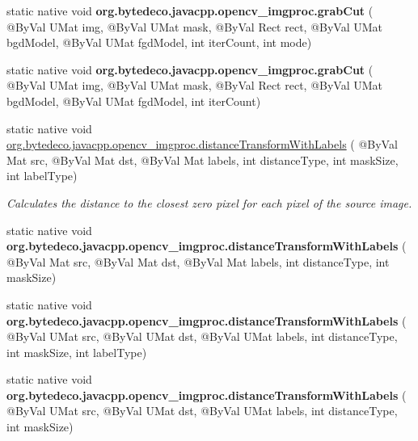 \begin{DoxyCompactItemize}
\item 
\mbox{\label{group__imgproc__misc_gab041eb7310c1d4f0d3ce2e7f2250c489}} 
static native void {\bfseries org.\+bytedeco.\+javacpp.\+opencv\+\_\+imgproc.\+grab\+Cut} ( @By\+Val U\+Mat img, @By\+Val U\+Mat mask, @By\+Val Rect rect, @By\+Val U\+Mat bgd\+Model, @By\+Val U\+Mat fgd\+Model, int iter\+Count, int mode)
\item 
\mbox{\label{group__imgproc__misc_gaab75a44bc618967aac53a0cb9edc9afd}} 
static native void {\bfseries org.\+bytedeco.\+javacpp.\+opencv\+\_\+imgproc.\+grab\+Cut} ( @By\+Val U\+Mat img, @By\+Val U\+Mat mask, @By\+Val Rect rect, @By\+Val U\+Mat bgd\+Model, @By\+Val U\+Mat fgd\+Model, int iter\+Count)
\item 
static native void \hyperlink{group__imgproc__misc_gaaaf8e9c28cfa3aa0fba026897d9ad6d8}{org.\+bytedeco.\+javacpp.\+opencv\+\_\+imgproc.\+distance\+Transform\+With\+Labels} ( @By\+Val Mat src, @By\+Val Mat dst, @By\+Val Mat labels, int distance\+Type, int mask\+Size, int label\+Type)
\begin{DoxyCompactList}\small\item\em Calculates the distance to the closest zero pixel for each pixel of the source image. \end{DoxyCompactList}\item 
\mbox{\label{group__imgproc__misc_gab10abe49dd9e7c89f5ce0119e86d2e5d}} 
static native void {\bfseries org.\+bytedeco.\+javacpp.\+opencv\+\_\+imgproc.\+distance\+Transform\+With\+Labels} ( @By\+Val Mat src, @By\+Val Mat dst, @By\+Val Mat labels, int distance\+Type, int mask\+Size)
\item 
\mbox{\label{group__imgproc__misc_gaa5ea0ac3fba988e5c3cb4812ad044cda}} 
static native void {\bfseries org.\+bytedeco.\+javacpp.\+opencv\+\_\+imgproc.\+distance\+Transform\+With\+Labels} ( @By\+Val U\+Mat src, @By\+Val U\+Mat dst, @By\+Val U\+Mat labels, int distance\+Type, int mask\+Size, int label\+Type)
\item 
\mbox{\label{group__imgproc__misc_gacb591056018fcb51f0dc3e0126df9df4}} 
static native void {\bfseries org.\+bytedeco.\+javacpp.\+opencv\+\_\+imgproc.\+distance\+Transform\+With\+Labels} ( @By\+Val U\+Mat src, @By\+Val U\+Mat dst, @By\+Val U\+Mat labels, int distance\+Type, int mask\+Size)

\end{DoxyCompactItemize}
